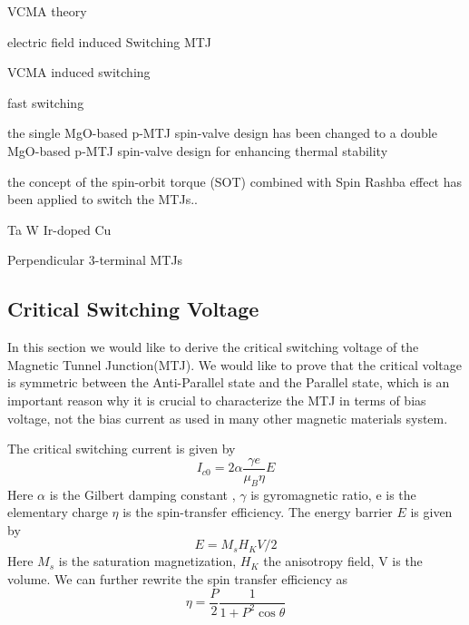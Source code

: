 VCMA theory\cite{VCMAtheory}

electric field induced Switching MTJ\cite{EswitchMTJ}


VCMA induced switching \cite{VCMA1}\cite{VCMA2}\cite{VCMA3}

 
fast switching \cite{STTMTJswitch}\cite{fastswitch}
 
 the single MgO-based p-MTJ spin-valve design has been changed to a double MgO-based p-MTJ spin-valve design for enhancing thermal stability\cite{doubleMTJ1}\cite{doubleMTJ2}\cite{doubleMTJ3}
 
  the concept of the spin-orbit torque (SOT) combined with Spin Rashba effect has been applied to switch the MTJs.\cite{SOTMTJ}.
  


  Ta\cite{3MTJTA}
  W\cite{3MTJW}
  Ir-doped Cu\cite{3MTJIr}

  Perpendicular 3-terminal MTJs\cite{3MTJPMA}


\newpage



\subsection{Critical Switching Voltage}

In this section we would like to derive the critical switching voltage of the Magnetic Tunnel Junction(MTJ). We would like to prove that the critical voltage is symmetric between the Anti-Parallel state and the Parallel state, which is an important reason why it is crucial to characterize the MTJ in terms of bias voltage, not the bias current as used in many other magnetic materials system.

The critical switching current is given by\cite{SlonSwitching}
\begin{equation}
    I_{c0} = 2 \alpha \frac{\gamma e}{\mu_B \eta}E
\end{equation}
Here $\alpha$ is the Gilbert damping constant , $\gamma$ is gyromagnetic ratio, e is the elementary charge  $\eta$ is the spin-transfer efficiency. The energy barrier $E$ is given by
\begin{equation}
    E = M_s H_K V / 2
\end{equation}
Here $M_s$ is the saturation magnetization, $H_K$ the anisotropy field, V is the volume. We can further rewrite the spin transfer efficiency as
\begin{equation}
    \eta = \frac{P}{2}\frac{1}{1+P^2 \cos{\theta}}
\end{equation}


